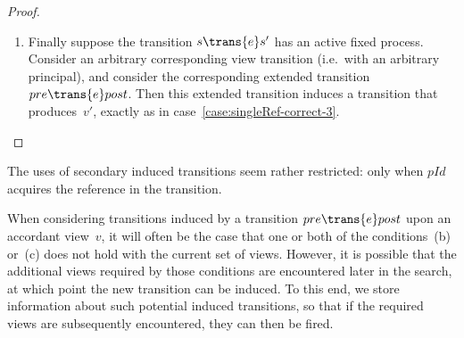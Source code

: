 \begin{proof}
\begin{enumerate}
\item
Finally suppose the transition $s \trans{e} s'$ has an active fixed process.
Consider an arbitrary corresponding view transition (i.e.~with an arbitrary
principal), and consider the corresponding extended transition $pre \trans{e}
post$.  Then this extended transition induces a transition that produces~$v'$,
exactly as in case~\ref{case:singleRef-correct-3}.
\end{enumerate}

\end{proof}


\begin{improve}
The uses of secondary induced transitions seem rather restricted: only when
$pId$ acquires the reference in the transition. 
\end{improve}


\begin{impNote}
When considering transitions induced by a transition $pre \trans{e} post$ upon
an accordant view~$v$, it will often be the case that one or both of the
conditions~(b) or~(c) does not hold with the current set of views.  However,
it is possible that the additional views required by those conditions are
encountered later in the search, at which point the new transition can be
induced.  To this end, we store information about such potential induced
transitions, so that if the required views are subsequently encountered, they
can then be fired.
\end{impNote}
